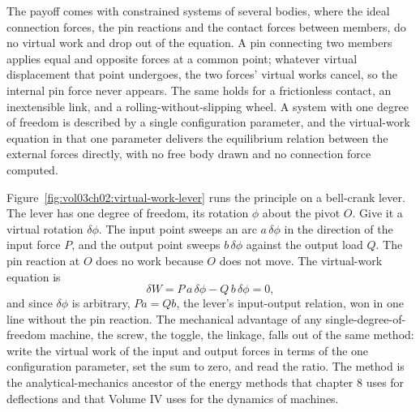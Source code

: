 The payoff comes with constrained systems of several bodies, where the
ideal connection forces, the pin reactions and the contact forces between
members, do no virtual work and drop out of the equation. A pin
connecting two members applies equal and opposite forces at a common
point; whatever virtual displacement that point undergoes, the two
forces' virtual works cancel, so the internal pin force never appears.
The same holds for a frictionless contact, an inextensible link, and a
rolling-without-slipping wheel. A system with one degree of freedom is
described by a single configuration parameter, and the virtual-work
equation in that one parameter delivers the equilibrium relation between
the external forces directly, with no free body drawn and no connection
force computed.



Figure~\ref{fig:vol03ch02:virtual-work-lever} runs the principle on a
bell-crank lever. The lever has one degree of freedom, its rotation
$\phi$ about the pivot $O$. Give it a virtual rotation $\delta\phi$. The
input point sweeps an arc $a\,\delta\phi$ in the direction of the input
force $P$, and the output point sweeps $b\,\delta\phi$ against the output
load $Q$. The pin reaction at $O$ does no work because $O$ does not move.
The virtual-work equation is
\[
\delta W = P\,a\,\delta\phi - Q\,b\,\delta\phi = 0,
\]
and since $\delta\phi$ is arbitrary, $Pa = Qb$, the lever's input-output
relation, won in one line without the pin reaction. The mechanical
advantage of any single-degree-of-freedom machine, the screw, the
toggle, the linkage, falls out of the same method: write the virtual
work of the input and output forces in terms of the one configuration
parameter, set the sum to zero, and read the ratio. The method is the
analytical-mechanics ancestor of the energy methods that chapter 8 uses
for deflections and that Volume IV uses for the dynamics of machines.

